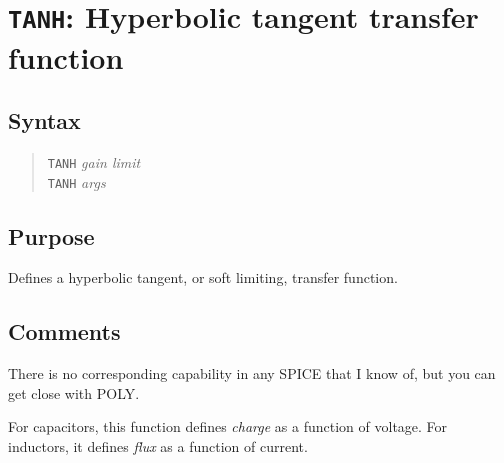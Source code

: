 %
%
%
%
\section{{\tt TANH}: Hyperbolic tangent transfer function}
\subsection{Syntax}
\begin{verse}
{\tt TANH} {\it gain limit}\\
{\tt TANH} {\it args}
\end{verse}
\subsection{Purpose}

Defines a hyperbolic tangent, or soft limiting, transfer function.
\subsection{Comments}

There is no corresponding capability in any SPICE that I know of, but
you can get close with POLY. 

For capacitors, this function defines {\em charge} as a function of
voltage.  For inductors, it defines {\em flux} as a function of
current.

